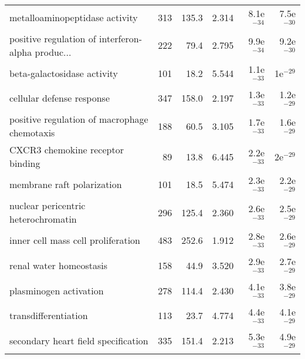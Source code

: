 \begin{longtable}{lrrrrr}
                    metalloaminopeptidase activity &                     313 &                   135.3 &      2.314 &         8.1e$^{-34}$ &         7.5e$^{-30}$ \\
 positive regulation of interferon-alpha produc... &                     222 &                    79.4 &      2.795 &         9.9e$^{-34}$ &         9.2e$^{-30}$ \\
                       beta-galactosidase activity &                     101 &                    18.2 &      5.544 &         1.1e$^{-33}$ &           1e$^{-29}$ \\
                         cellular defense response &                     347 &                   158.0 &      2.197 &         1.3e$^{-33}$ &         1.2e$^{-29}$ \\
      positive regulation of macrophage chemotaxis &                     188 &                    60.5 &      3.105 &         1.7e$^{-33}$ &         1.6e$^{-29}$ \\
                  CXCR3 chemokine receptor binding &                      89 &                    13.8 &      6.445 &         2.2e$^{-33}$ &           2e$^{-29}$ \\
                        membrane raft polarization &                     101 &                    18.5 &      5.474 &         2.3e$^{-33}$ &         2.2e$^{-29}$ \\
               nuclear pericentric heterochromatin &                     296 &                   125.4 &      2.360 &         2.6e$^{-33}$ &         2.5e$^{-29}$ \\
                inner cell mass cell proliferation &                     483 &                   252.6 &      1.912 &         2.8e$^{-33}$ &         2.6e$^{-29}$ \\
                           renal water homeostasis &                     158 &                    44.9 &      3.520 &         2.9e$^{-33}$ &         2.7e$^{-29}$ \\
                            plasminogen activation &                     278 &                   114.4 &      2.430 &         4.1e$^{-33}$ &         3.8e$^{-29}$ \\
                              transdifferentiation &                     113 &                    23.7 &      4.774 &         4.4e$^{-33}$ &         4.1e$^{-29}$ \\
               secondary heart field specification &                     335 &                   151.4 &      2.213 &         5.3e$^{-33}$ &         4.9e$^{-29}$ \\

\end{longtable}
